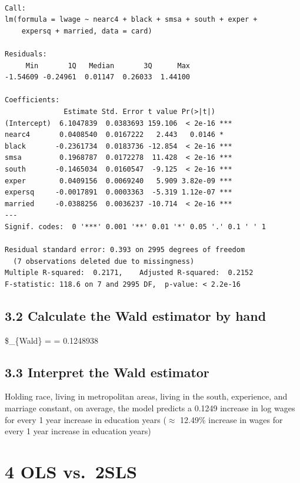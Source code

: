 \documentclass[
  letterpaper,
  DIV=11,
  numbers=noendperiod]{scrartcl}
\begin{document}
\begin{verbatim}

Call:
lm(formula = lwage ~ nearc4 + black + smsa + south + exper + 
    expersq + married, data = card)

Residuals:
     Min       1Q   Median       3Q      Max 
-1.54609 -0.24961  0.01147  0.26033  1.44100 

Coefficients:
              Estimate Std. Error t value Pr(>|t|)    
(Intercept)  6.1047839  0.0383693 159.106  < 2e-16 ***
nearc4       0.0408540  0.0167222   2.443   0.0146 *  
black       -0.2361734  0.0183736 -12.854  < 2e-16 ***
smsa         0.1968787  0.0172278  11.428  < 2e-16 ***
south       -0.1465034  0.0160547  -9.125  < 2e-16 ***
exper        0.0409156  0.0069240   5.909 3.82e-09 ***
expersq     -0.0017891  0.0003363  -5.319 1.12e-07 ***
married     -0.0388256  0.0036237 -10.714  < 2e-16 ***
---
Signif. codes:  0 '***' 0.001 '**' 0.01 '*' 0.05 '.' 0.1 ' ' 1

Residual standard error: 0.393 on 2995 degrees of freedom
  (7 observations deleted due to missingness)
Multiple R-squared:  0.2171,    Adjusted R-squared:  0.2152 
F-statistic: 118.6 on 7 and 2995 DF,  p-value: < 2.2e-16
\end{verbatim}

\subsection{3.2 Calculate the Wald estimator by
hand}\label{calculate-the-wald-estimator-by-hand}

\$\hat{\tau}\_\{Wald\} =  = 0.1248938

\subsection{3.3 Interpret the Wald
estimator}\label{interpret-the-wald-estimator}

Holding race, living in metropolitan areas, living in the south,
experience, and marriage constant, on average, the model predicts a
0.1249 increase in log wages for every 1 year increase in education
years (\(\approx\) 12.49\% increase in wages for every 1 year increase
in education years)

\newpage

\section{4 OLS vs.~2SLS}\label{ols-vs.-2sls}
\end{document}
